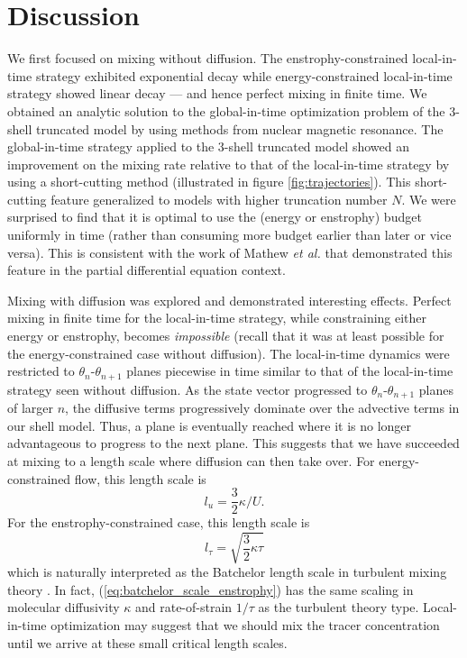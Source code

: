 \section{Discussion}
\label{sec:discussion_shell}
We first focused on mixing without diffusion. The enstrophy-constrained local-in-time strategy exhibited exponential decay while energy-constrained local-in-time strategy showed linear decay --- and hence perfect mixing in finite time. We obtained an analytic solution to the global-in-time optimization problem of the 3-shell truncated model by using methods from nuclear magnetic resonance. The global-in-time strategy applied to the 3-shell truncated model showed an improvement on the mixing rate relative to that of the local-in-time strategy by using a short-cutting method (illustrated in figure \ref{fig:trajectories}). This short-cutting feature generalized to models with higher truncation number $N$. We were surprised to find that it is optimal to use the (energy or enstrophy) budget uniformly in time (rather than consuming more budget earlier than later or vice versa). This is consistent with the work of Mathew {\it et al.} \cite{Mathew2007b} that demonstrated this feature in the partial differential equation context.

Mixing with diffusion was explored and demonstrated interesting effects.  Perfect mixing in finite time for the local-in-time strategy, while constraining either energy or enstrophy, becomes {\it impossible} (recall that it was at least possible for the energy-constrained case without diffusion). The local-in-time dynamics were restricted to $\theta_{n}$-$\theta_{n+1}$ planes piecewise in time similar to that of the local-in-time strategy seen without diffusion. As the state vector progressed to $\theta_{n}$-$\theta_{n+1}$  planes of larger $n$, the diffusive terms progressively dominate over the advective terms in our shell model. Thus, a plane is eventually reached where it is no longer advantageous to progress to the next plane. This suggests that we have succeeded at mixing to a length scale where diffusion can then take over. For energy-constrained flow, this length scale is 
\begin{equation}
\label{eq:batchelor_scale_energy}
l_{u}=\frac{3}{2}\kappa / U.
\end{equation}
For the enstrophy-constrained case, this length scale is  
\begin{equation}
\label{eq:batchelor_scale_enstrophy}
l_{\tau}=\sqrt{\frac{3}{2}\kappa \tau}
\end{equation}
which is naturally interpreted as the Batchelor length scale in turbulent mixing theory \cite{Dimotakis2005,Holzer1994b,Shraiman2000a,Batchelor1959a, Corrsin1951,Obukhov1949}. In fact, (\ref{eq:batchelor_scale_enstrophy}) has the same scaling in molecular diffusivity $\kappa$ and rate-of-strain $1/\tau$ as the turbulent theory type. Local-in-time optimization may suggest that we should mix the tracer concentration until we arrive at these small critical length scales.

